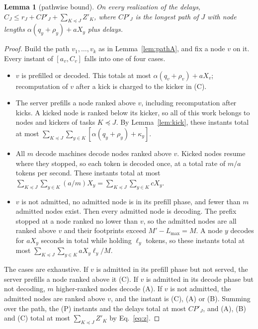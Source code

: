 \documentclass{article}
\newtheorem{lemma}{Lemma}
\begin{document}
\begin{lemma}[pathwise bound]
\label{lem:pathD}
On every realization of the delays, $C_J \le r_J + CP'_J + \sum_{K \preceq J} Z'_K$, where $CP'_J$ is the longest
path of $J$ with node lengths $\alpha(q_y + \rho_y) + aX_y$ plus delays.
\end{lemma}
\begin{proof}
Build the path $v_1, \dots, v_k$ as in Lemma~\ref{lem:pathA}, and fix a node $v$ on it. Every instant of
$[a_v, C_v]$ falls into one of four cases.
\begin{itemize}
\item[(P)] $v$ is prefilled or decoded. This totals at most $\alpha(q_v + \rho_v) + aX_v$; recomputation of $v$
after a kick is charged to the kicker in (C).
\item[(C)] The server prefills a node ranked above $v$, including recomputation after kicks. A kicked node is
ranked below its kicker, so all of this work belongs to nodes and kickers of tasks $K \preceq J$. By
Lemma~\ref{lem:kick}, these instants total at most $\sum_{K \preceq J}\sum_{y \in K} [\alpha(q_y+\rho_y) + \kappa_y]$.
\item[(A)] All $m$ decode machines decode nodes ranked above $v$. Kicked nodes resume where they stopped, so each
token is decoded once, at a total rate of $m/a$ tokens per second. These instants total at most
$\sum_{K \preceq J}\sum_{y \in K} (a/m) X_y = \sum_{K \preceq J}\sum_{y \in K} cX_y$.
\item[(B)] $v$ is not admitted, no admitted node is in its prefill phase, and fewer than $m$ admitted nodes exist.
Then every admitted node is decoding. The prefix stopped at a node ranked no lower than $v$, so the admitted nodes
are all ranked above $v$ and their footprints exceed $M' - L_{\max} = M$. A node $y$ decodes for $aX_y$ seconds in
total while holding $\ell_y$ tokens, so these instants total at most
$\sum_{K \preceq J}\sum_{y \in K} aX_y\ell_y/M$.
\end{itemize}
The cases are exhaustive. If $v$ is admitted in its prefill phase but not served, the server prefills a node ranked
above it (C). If $v$ is admitted in its decode phase but not decoding, $m$ higher-ranked nodes decode (A). If $v$ is
not admitted, the admitted nodes are ranked above $v$, and the instant is (C), (A) or (B). Summing over the path,
the (P) instants and the delays total at most $CP'_J$, and (A), (B) and (C) total at most
$\sum_{K \preceq J} Z'_K$ by Eq.~\eqref{eq:z}.
\end{proof}
\end{document}
